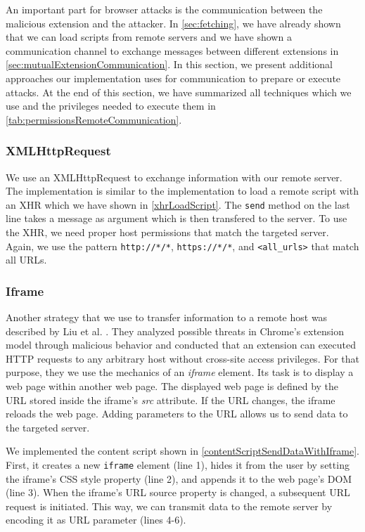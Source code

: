 	An important part for browser attacks is the communication between the malicious extension and the attacker. In \autoref{sec:fetching}, we have already shown that we can load scripts from remote servers and we have shown a communication channel to exchange messages between different extensions in \autoref{sec:mutualExtensionCommunication}. In this section, we present additional approaches our implementation uses for communication to prepare or execute attacks. At the end of this section, we have summarized all techniques which we use and the privileges needed to execute them in \autoref{tab:permissionsRemoteCommunication}.
	
\subsubsection{XMLHttpRequest}
	
	We use an XMLHttpRequest to exchange information with our remote server. The implementation is similar to the implementation to load a remote script with an XHR which we have shown in \autoref{xhrLoadScript}. The \texttt{send} method on the last line takes a message as argument which is then transfered to the server. To use the XHR, we need proper host permissions that match the targeted server. Again, we use the pattern \texttt{http://*/*}, \texttt{https://*/*}, and \texttt{<all\_urls>} that match all URLs.

\subsubsection{Iframe}
	
	Another strategy that we use to transfer information to a remote host was described by Liu et al. \cite{Liu12chromeextensions:}. They analyzed possible threats in Chrome's extension model through malicious behavior and conducted that an extension can executed HTTP requests to any arbitrary host without cross-site access privileges. For that purpose, they we use the mechanics of an \textit{iframe} element. Its task is to display a web page within another web page. The displayed web page is defined by the URL stored inside the iframe's \textit{src} attribute. If the URL changes, the iframe reloads the web page. Adding parameters to the URL allows us to send data to the targeted server. 
	
	We implemented the content script shown in \autoref{contentScriptSendDataWithIframe}. First, it creates a new \texttt{iframe} element (line 1), hides it from the user by setting the iframe's CSS style property (line 2), and appends it to the web page's DOM (line 3). When the iframe's URL source property is changed, a subsequent URL request is initiated. This way, we can transmit data to the remote server by encoding it as URL parameter (lines 4-6).
	
